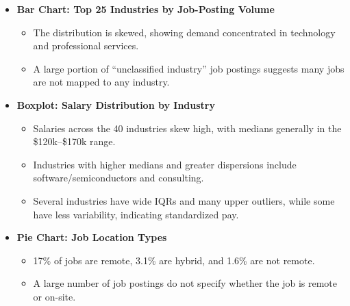 \documentclass[
  letterpaper,
  DIV=11,
  numbers=noendperiod]{scrartcl}
\providecommand{\tightlist}{%
  \setlength{\itemsep}{0pt}\setlength{\parskip}{0pt}}
\begin{document}
\begin{itemize}
\tightlist
\item
  \textbf{Bar Chart: Top 25 Industries by Job-Posting Volume}

  \begin{itemize}
  \tightlist
  \item
    The distribution is skewed, showing demand concentrated in
    technology and professional services.\\
  \item
    A large portion of ``unclassified industry'' job postings suggests
    many jobs are not mapped to any industry.
  \end{itemize}
\item
  \textbf{Boxplot: Salary Distribution by Industry}

  \begin{itemize}
  \tightlist
  \item
    Salaries across the 40 industries skew high, with medians generally
    in the \$120k--\$170k range.\\
  \item
    Industries with higher medians and greater dispersions include
    software/semiconductors and consulting.\\
  \item
    Several industries have wide IQRs and many upper outliers, while
    some have less variability, indicating standardized pay.
  \end{itemize}
\item
  \textbf{Pie Chart: Job Location Types}

  \begin{itemize}
  \tightlist
  \item
    17\% of jobs are remote, 3.1\% are hybrid, and 1.6\% are not
    remote.\\
  \item
    A large number of job postings do not specify whether the job is
    remote or on-site.
  \end{itemize}
\end{itemize}
\end{document}
